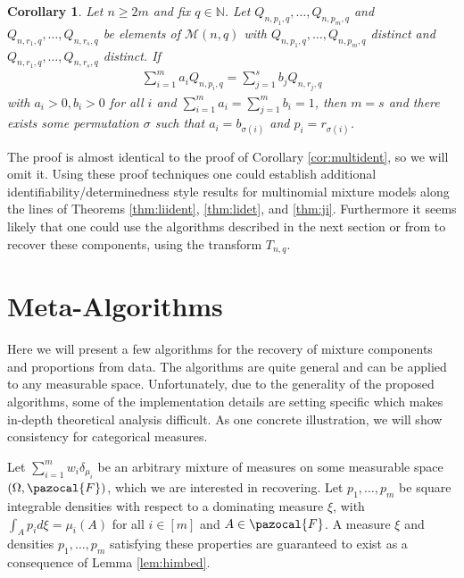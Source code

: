 \documentclass[aos,preprint]{imsart}
\def\nn{\mathbb{N}}
\def\sF{\pazocal{F}}
\def\sM{\pazocal{M}}
\def\sM{\mathscr{M}}
\theoremstyle{plain}
\newtheorem{cor}{Corollary}[section]
\theoremstyle{defintion}
\begin{document}
\begin{cor} \label{cor:multdet}
	Let $n\ge2m$ and fix $q\in \nn$. Let $Q_{n,p_1,q},\ldots,Q_{n,p_m,q}$ and $Q_{n,r_1,q},\ldots,Q_{n,r_s,q}$ be elements of $\sM\left( n,q \right)$ with $Q_{n,p_1,q},\ldots,Q_{n,p_m,q}$ distinct and $Q_{n,r_1,q},\ldots,Q_{n,r_s,q}$ distinct. If
	\begin{eqnarray*}
		\sum_{i=1}^m a_i Q_{n,p_i,q} = \sum_{j=1}^s b_j Q_{n,r_j,q}
	\end{eqnarray*} 
	with $a_i>0,b_i> 0$ for all $i$ and $\sum_{i=1}^m a_i = \sum_{j=1}^m b_i= 1$, then $m=s$ and there exists some permutation $\sigma$ such that $a_i = b_{\sigma(i)}$ and $p_i = r_{\sigma(i)}$. 

\end{cor}
The proof is almost identical to the proof of Corollary \ref{cor:multident}, so we will omit it. Using these proof techniques one could establish additional identifiability/determinedness style results for multinomial mixture models along the lines of Theorems \ref{thm:liident}, \ref{thm:lidet}, and \ref{thm:ji}. Furthermore it seems likely that one could use the algorithms described in the next section or from \cite{anandkumar14,arora12, rabani14} to recover these components, using the transform $T_{n,q}$.
\section{Meta-Algorithms} \label{sec:meta}
Here we will present a few algorithms for the recovery of mixture components and proportions from data. The algorithms are quite general and can be applied to any measurable space. Unfortunately, due to the generality of the proposed algorithms, some of the implementation details are setting specific which makes in-depth theoretical analysis difficult. As one concrete illustration, we will show consistency for categorical measures.

Let $\sum_{i=1}^m w_i \delta_{\mu_i}$ be an arbitrary mixture of measures on some measurable space $(\Omega,\sF)$, which we are interested in recovering. Let $p_1,\ldots,p_m$ be square integrable densities with respect to a dominating measure $\xi$, with $\int_A p_i d\xi = \mu_i\left( A \right)$ for all $i \in [m]$ and $A \in \sF$. A measure $\xi$ and densities $p_1,\ldots,p_m$ satisfying these properties are guaranteed to exist as a consequence of Lemma \ref{lem:himbed}.
\end{document}
